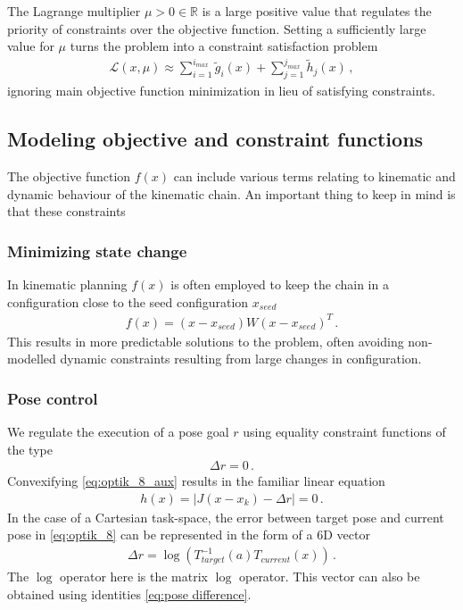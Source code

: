 \documentclass[times, utf8, diplomski, english]{fer}
\begin{document}
The Lagrange multiplier $\mu > 0 \in \mathbb{R}$ is a large positive value that regulates the priority of constraints over the objective function. Setting a sufficiently large value for $\mu$ turns the problem into a constraint satisfaction problem
\begin{align}
\label{optik_6}
\mathcal{L}(x,\mu) \approx \sum\limits_{i = 1}^{i_{max}}{\tilde{g}_{i}\left(x\right)}
+ \sum\limits_{j = 1}^{j_{max}}{\tilde{h}_{j}\left(x\right)}\, ,
\end{align}
ignoring main objective function minimization in lieu of satisfying constraints.
\subsection{Modeling objective and constraint functions}
The objective function $f\left(x\right)$ can include various terms relating to kinematic and dynamic behaviour of the kinematic chain.
An important thing to keep in mind is that these constraints
\subsubsection{Minimizing state change}
In kinematic planning $f\left(x\right)$ is often employed to keep the chain in a configuration close to the seed configuration $x_{seed}$
\begin{align}
\label{optik_7}
f\left(x\right) = \left(x - x_{seed}\right)W\left(x - x_{seed}\right)^{T}\, .
\end{align}
This results in more predictable solutions to the problem, often avoiding non-modelled dynamic constraints resulting from large changes in configuration.

\subsubsection{Pose control}
We regulate the execution of a pose goal $r$ using equality constraint functions of the type
\begin{align}
\label{eq:optik_8_aux}
\Delta r = 0\, .
\end{align}
Convexifying \eqref{eq:optik_8_aux} results in the familiar linear equation
\begin{align}
\label{eq:optik_8}
h\left(x\right) = \left\vert J\left(x - x_{k}\right) - \Delta r \right\vert = 0\, .
\end{align}
In the case of a Cartesian task-space, the error between target pose and current pose in \eqref{eq:optik_8} can be represented in the form of a 6D vector
\begin{align}
\Delta r = \log\left(T_{target}^{-1}\left(a\right) T_{current}\left(x\right)\right)\, .
\end{align}
The $\log$ operator here is the matrix $\log$ operator.
This vector can also be obtained using identities \eqref{eq:pose difference}.
\end{document}
